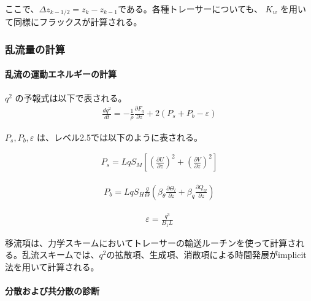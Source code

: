 ここで、\(\Delta z_{k-1/2}=z_k-z_{k-1}\)である。各種トレーサーについても、 \(K_w\) を用いて同様にフラックスが計算される。

\hypertarget{ux4e71ux6d41ux91cfux306eux8a08ux7b97}{%
\subsubsection{乱流量の計算}\label{ux4e71ux6d41ux91cfux306eux8a08ux7b97}}

\hypertarget{ux4e71ux6d41ux306eux904bux52d5ux30a8ux30cdux30ebux30aeux30fcux306eux8a08ux7b97}{%
\paragraph{乱流の運動エネルギーの計算}\label{ux4e71ux6d41ux306eux904bux52d5ux30a8ux30cdux30ebux30aeux30fcux306eux8a08ux7b97}}

\(q^2\) の予報式は以下で表される。 \begin{eqnarray} \frac{d q^2}{dt}=-\frac{1}{\rho}\frac{\partial F_q}{\partial z}+2\left(P_s+P_b-\varepsilon\right) \end{eqnarray}

\(P_s,P_b,\varepsilon\) は、レベル2.5では以下のように表される。

\begin{eqnarray}P_s=Lq S_M \left[\left(\frac{\partial U}{\partial z}\right)^2+\left(\frac{\partial V}{\partial z}\right)^2\right]\end{eqnarray}

\begin{eqnarray}P_b=Lq S_H \frac{g}{\Theta}\left(\beta_\theta \frac{\partial \Theta_l}{\partial z}+\beta_q \frac{\partial Q_w}{\partial z}\right)\end{eqnarray}

\begin{eqnarray}\varepsilon=\frac{q^3}{B_1L}\end{eqnarray}

移流項は、力学スキームにおいてトレーサーの輸送ルーチンを使って計算される。乱流スキームでは、\(q^2\)の拡散項、生成項、消散項による時間発展がimplicit法を用いて計算される。

\hypertarget{ux5206ux6563ux304aux3088ux3073ux5171ux5206ux6563ux306eux8a3aux65ad}{%
\paragraph{分散および共分散の診断}\label{ux5206ux6563ux304aux3088ux3073ux5171ux5206ux6563ux306eux8a3aux65ad}}

